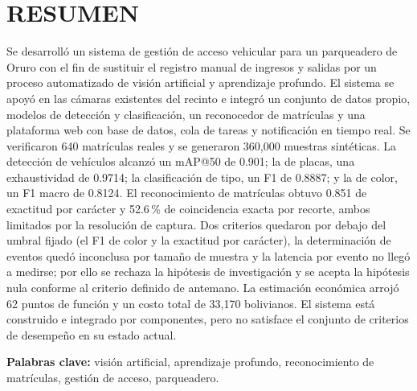 \section*{RESUMEN}

Se desarrolló un sistema de gestión de acceso vehicular para un parqueadero de
Oruro con el fin de sustituir el registro manual de ingresos y salidas por un
proceso automatizado de visión artificial y aprendizaje profundo. El sistema se
apoyó en las cámaras existentes del recinto e integró un conjunto de datos propio,
modelos de detección y clasificación, un reconocedor de matrículas y una plataforma
web con base de datos, cola de tareas y notificación en tiempo real. Se verificaron
640 matrículas reales y se generaron 360,000 muestras sintéticas. La detección de
vehículos alcanzó un mAP@50 de 0.901; la de placas, una exhaustividad de 0.9714; la
clasificación de tipo, un F1 de 0.8887; y la de color, un F1 macro de 0.8124. El
reconocimiento de matrículas obtuvo 0.851 de exactitud por carácter y 52.6\,\% de
coincidencia exacta por recorte, ambos limitados por la resolución de captura. Dos
criterios quedaron por debajo del umbral fijado (el F1 de color y la exactitud
por carácter), la determinación de eventos quedó inconclusa por tamaño de
muestra y la latencia por evento no llegó a medirse; por ello se rechaza la
hipótesis de investigación y se acepta la hipótesis nula conforme al criterio
definido de antemano. La estimación económica arrojó 62 puntos de función y un
costo total de 33,170 bolivianos. El sistema está construido e integrado por
componentes, pero no satisface el conjunto de criterios de desempeño en su estado
actual.

\vspace{1em}
\noindent\textbf{Palabras clave:} visión artificial, aprendizaje profundo,
reconocimiento de matrículas, gestión de acceso, parqueadero.

